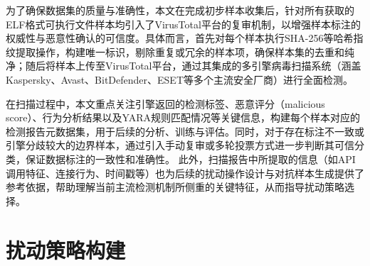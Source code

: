 为了确保数据集的质量与准确性，本文在完成初步样本收集后，针对所有获取的ELF格式可执行文件样本均引入了VirusTotal\cite{VirusTotal}平台的复审机制，以增强样本标注的权威性与恶意性确认的可信度。具体而言，首先对每个样本执行SHA-256等哈希指纹提取操作，构建唯一标识，剔除重复或冗余的样本项，确保样本集的去重和纯净；随后将样本上传至VirusTotal平台，通过其集成的多引擎病毒扫描系统（涵盖Kaspersky、Avast、BitDefender、ESET等多个主流安全厂商）进行全面检测。


在扫描过程中，本文重点关注引擎返回的检测标签、恶意评分（malicious score）、行为分析结果以及YARA规则匹配情况等关键信息，构建每个样本对应的检测报告元数据集，用于后续的分析、训练与评估。同时，对于存在标注不一致或引擎分歧较大的边界样本，通过引入手动复审或多轮投票方式进一步判断其可信分类，保证数据标注的一致性和准确性。
此外，扫描报告中所提取的信息（如API调用特征、连接行为、时间戳等）也为后续的扰动操作设计与对抗样本生成提供了参考依据，帮助理解当前主流检测机制所侧重的关键特征，从而指导扰动策略选择。



\section{扰动策略构建}


